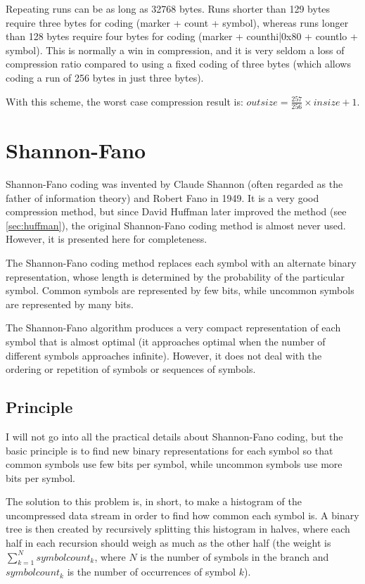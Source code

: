 \documentclass[a4paper,11pt,oneside]{report}
\begin{document}
Repeating runs can be as long as 32768 bytes. Runs shorter than 129
bytes require three bytes for coding (marker + count + symbol), whereas
runs longer than 128 bytes require four bytes for coding (marker +
counthi|0x80 + countlo + symbol). This is normally a win in compression,
and it is very seldom a loss of compression ratio compared to using a
fixed coding of three bytes (which allows coding a run of 256 bytes in
just three bytes).

With this scheme, the worst case compression result is:
$outsize=\frac{257}{256}\times insize+1$.


\section{Shannon-Fano}
\label{sec:shannonfano}
Shannon-Fano coding was invented by Claude Shannon (often regarded as
the father of information theory) and Robert Fano in 1949. It is a
very good compression method, but since David Huffman later improved the
method (see \ref{sec:huffman}), the original Shannon-Fano coding method
is almost never used. However, it is presented here for completeness.

The Shannon-Fano coding method replaces each symbol with an alternate
binary representation, whose length is determined by the probability of
the particular symbol. Common symbols are represented by few bits, while
uncommon symbols are represented by many bits.

The Shannon-Fano algorithm produces a very compact representation of
each symbol that is almost optimal (it approaches optimal when the number
of different symbols approaches infinite). However, it does not deal with
the ordering or repetition of symbols or sequences of symbols.


\subsection{Principle}
I will not go into all the practical details about Shannon-Fano coding, but
the basic principle is to find new binary representations for each
symbol so that common symbols use few bits per symbol, while uncommon
symbols use more bits per symbol.

The solution to this problem is, in short, to make a histogram of the
uncompressed data stream in order to find how common each symbol is.
A binary tree is then created by recursively splitting this histogram
in halves, where each half in each recursion should weigh as much as the
other half (the weight is $\sum_{k=1}^{N}{symbolcount_k}$, where $N$ is
the number of symbols in the branch and $symbolcount_k$ is the number of
occurrences of symbol $k$).
\end{document}

